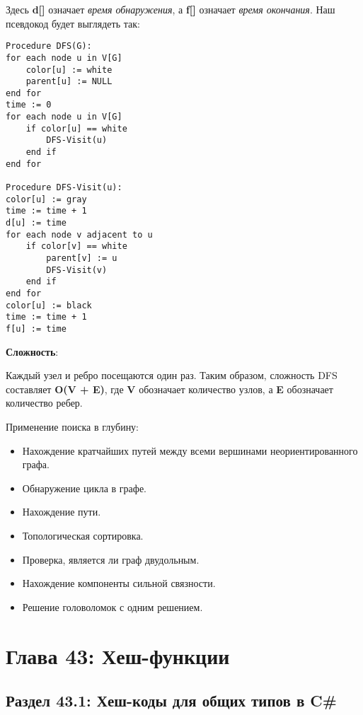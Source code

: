\vspace{\baselineskip}

Здесь \textbf{d[]} означает \textit{время обнаружения}, а \textbf{f[]} означает \textit{время окончания}. Наш псевдокод будет выглядеть так:

\begin{tcolorbox}
\begin{verbatim}
Procedure DFS(G):
for each node u in V[G]
    color[u] := white
    parent[u] := NULL
end for
time := 0
for each node u in V[G]
    if color[u] == white
        DFS-Visit(u)
    end if
end for

Procedure DFS-Visit(u):
color[u] := gray
time := time + 1
d[u] := time
for each node v adjacent to u
    if color[v] == white
        parent[v] := u
        DFS-Visit(v)
    end if
end for
color[u] := black
time := time + 1
f[u] := time
\end{verbatim}
\end{tcolorbox}

\textbf{Сложность}:

\vspace{\baselineskip}

Каждый узел и ребро посещаются один раз. Таким образом, сложность DFS составляет \textbf{O(V + E)}, где \textbf{V} обозначает количество узлов, а \textbf{E} обозначает количество ребер.

\vspace{\baselineskip}

Применение поиска в глубину:

\begin{itemize}
    \item Нахождение кратчайших путей между всеми вершинами неориентированного графа.
    \item Обнаружение цикла в графе.
    \item Нахождение пути.
    \item Топологическая сортировка.
    \item Проверка, является ли граф двудольным.
    \item Нахождение компоненты сильной связности.
    \item Решение головоломок с одним решением.
\end{itemize}

\chapter*{Глава 43: Хеш-функции}
\section*{Раздел 43.1: Хеш-коды для общих типов в C\#}

